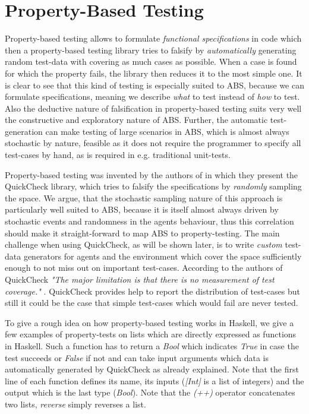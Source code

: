 \section{Property-Based Testing}
\label{sec:proptesting}

Property-based testing allows to formulate \textit{functional specifications} in code which then a property-based testing library tries to falsify by \textit{automatically} generating random test-data with covering as much cases as possible. When a case is found for which the property fails, the library then reduces it to the most simple one. It is clear to see that this kind of testing is especially suited to ABS, because we can formulate specifications, meaning we describe \textit{what} to test instead of \textit{how} to test. Also the deductive nature of falsification in property-based testing suits very well the constructive and exploratory nature of ABS. Further, the automatic test-generation can make testing of large scenarios in ABS, which is almost always stochastic by nature, feasible as it does not require the programmer to specify all test-cases by hand, as is required in e.g. traditional unit-tests.

Property-based testing was invented by the authors of \cite{claessen_quickcheck_2000,claessen_testing_2002} in which they present the QuickCheck library, which tries to falsify the specifications by \textit{randomly} sampling the space. We argue, that the stochastic sampling nature of this approach is particularly well suited to ABS, because it is itself almost always driven by stochastic events and randomness in the agents behaviour, thus this correlation should make it straight-forward to map ABS to property-testing. The main challenge when using QuickCheck, as will be shown later, is to write \textit{custom} test-data generators for agents and the environment which cover the space sufficiently enough to not miss out on important test-cases. According to the authors of QuickCheck \textit{"The major limitation is that there is no measurement of test coverage."} \cite{claessen_quickcheck_2000}. QuickCheck provides help to report the distribution of test-cases but still it could be the case that simple test-cases which would fail are never tested.

To give a rough idea on how property-based testing works in Haskell, we give a few examples of property-tests on lists which are directly expressed as functions in Haskell. Such a function has to return a \textit{Bool} which indicates \textit{True} in case the test succeeds or \textit{False} if not and can take input arguments which data is automatically generated by QuickCheck as already explained. Note that the first line of each function defines its name, its inputs (\textit{[Int]} is a list of integers) and the output which is the last type (\textit{Bool}). Note that the \textit{(++)} operator concatenates two lists, \textit{reverse} simply reverses a list.

